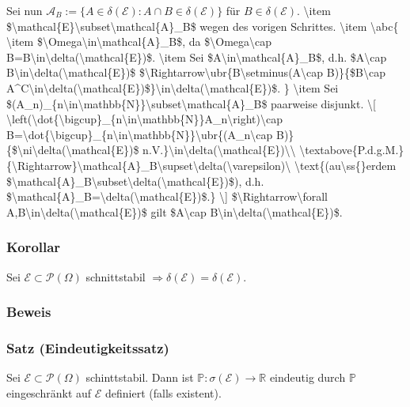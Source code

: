 Sei nun $\mathcal{A}_B:=\{A\in\delta(\mathcal{E})\colon A\cap B\in\delta(\mathcal{E})\}$ f\"ur $B\in\delta(\mathcal{E})$.
\num{
\item $\mathcal{E}\subset\mathcal{A}_B$ wegen des vorigen Schrittes.
\item
\abc{
\item $\Omega\in\mathcal{A}_B$, da $\Omega\cap B=B\in\delta(\mathcal{E})$.
\item Sei $A\in\mathcal{A}_B$, d.h. $A\cap B\in\delta(\mathcal{E})$ $\Rightarrow\ubr{B\setminus(A\cap B)}{$B\cap A^C\in\delta(\mathcal{E})$}\in\delta(\mathcal{E})$.
}
\item Sei $(A_n)_{n\in\mathbb{N}}\subset\mathcal{A}_B$ paarweise disjunkt.
\[
\left(\dot{\bigcup}_{n\in\mathbb{N}}A_n\right)\cap B=\dot{\bigcup}_{n\in\mathbb{N}}\ubr{(A_n\cap B)}{$\ni\delta(\mathcal{E})$ n.V.}\in\delta(\mathcal{E})\\
\textabove{P.d.g.M.}{\Rightarrow}\mathcal{A}_B\supset\delta(\varepsilon)\ \text{(au\ss{}erdem $\mathcal{A}_B\subset\delta(\mathcal{E})$), d.h. $\mathcal{A}_B=\delta(\mathcal{E})$.}
\]
$\Rightarrow\forall A,B\in\delta(\mathcal{E})$ gilt $A\cap B\in\delta(\mathcal{E})$.
}
\subsubsection{Korollar}
Sei $\mathcal{E}\subset\mathcal{P}(\Omega)$ schnittstabil $\Rightarrow\delta(\mathcal{E})=\delta(\mathcal{E})$.
\subsubsection{Beweis}
\subsubsection{Satz (Eindeutigkeitssatz)}
Sei $\mathcal{E}\subset\mathcal{P}(\Omega)$ schinttstabil. Dann ist $\mathbb{P}\colon\sigma(\mathcal{E})\to\mathbb{R}$ eindeutig durch $\mathbb{P}$ eingeschr\"ankt auf $\mathcal{E}$ definiert (falls existent).
